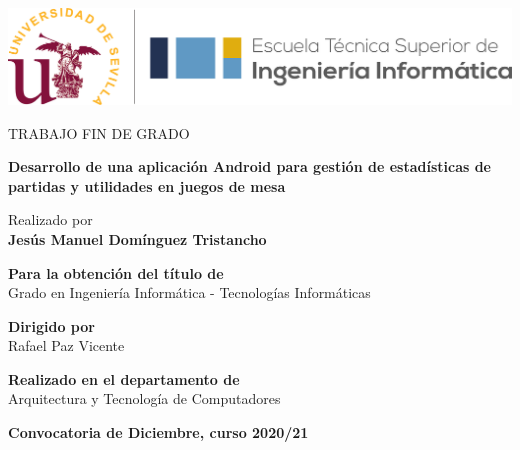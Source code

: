 \begin{center}

\vspace*{1cm}

\includegraphics[width=\textwidth]{fig/etsii_us.png}

\vspace*{3cm}
\begin{large}
TRABAJO FIN DE GRADO
\end{large}

\vspace*{0.1in}
\textbf{\huge Desarrollo de una aplicación Android para gestión de estadísticas de partidas y utilidades en juegos de mesa} %

\vspace*{.2in}

{\large Realizado por}\\
\textbf{\Large Jesús Manuel Domínguez Tristancho} %

\vspace*{2cm}

\textbf{Para la obtención del título de}\\
{\large Grado en Ingeniería Informática - Tecnologías Informáticas} %

\vspace*{0.2in}

\textbf{Dirigido por}\\
{\large Rafael Paz Vicente}\\ %

\vspace*{0.2in}

\textbf{Realizado en el departamento de}\\
{\large Arquitectura y Tecnología de Computadores}

\vspace*{.6in}
\textbf{\Large Convocatoria de Diciembre, curso 2020/21} %

\end{center}


\thispagestyle{empty} %
\clearpage\setcounter{page}{1} %
